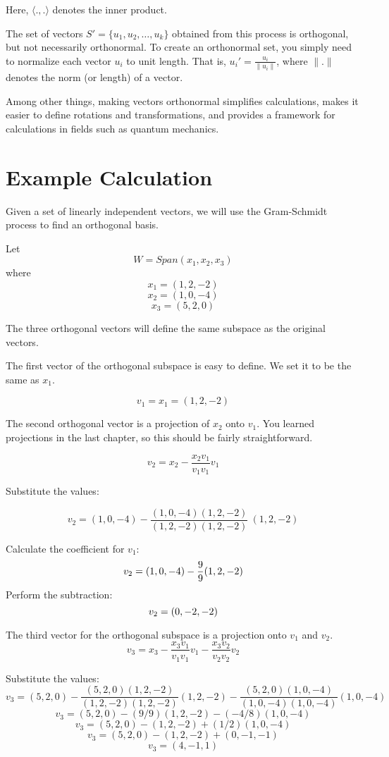 Here, $\langle . , . \rangle$ denotes the inner product. 

The set of vectors $S' = \{u_1, u_2, \ldots, u_k\}$ obtained from this
process is orthogonal, but not necessarily orthonormal. To create
an orthonormal set, you simply need to normalize each vector $u_i$ to
unit length. That is, $u_i' = \frac{u_i}{\|u_i\|}$, where $\|.\|$
denotes the norm (or length) of a vector.

Among other things, making vectors orthonormal simplifies calculations, makes it easier to define rotations and transformations, and provides a framework for calculations in fields such as quantum mechanics.

\section{Example Calculation}

Given a set of linearly independent vectors, we will use the Gram-Schmidt process to find an orthogonal basis.

Let $$W = Span (x_1, x_2, x_3)$$ where
$$x_1 = (1, 2, -2) $$
$$x_2 = (1,0,-4) $$
$$x_3 = (5,2,0)$$

The three orthogonal vectors will define the same subspace as the original vectors. 

The first vector of the orthogonal subspace is easy to define. We set it to be the same as $x_1$.

$$v_1 = x_1 = (1, 2, -2)$$

The second orthogonal vector is a projection of $x_2$ onto $v_1$. You learned projections in the last chapter, so this should be fairly straightforward.

$$v_2 = x_2 - \frac{x_2v_1}{v_1v_1} v_1$$

Substitute the values:

$$v_2 = (1, 0, -4)  - \frac{(1,0, -4)(1,2,-2)}{(1,2,-2)(1,2,-2)} \ (1, 2, -2) $$

Calculate the coefficient for $v_1$:
$$v_2 = (1, 0, -4) - \frac{9}{9} (1, 2, -2)  \\$$
Perform the subtraction:
$$v_2 = (0, -2, -2) \\$$
 
The third vector for the orthogonal subspace is a projection onto $v_1$ and $v_2$. 
$$v_3 = x_3 - \frac{x_3v_1}{v_1v_1} v_1 - \frac{x_3v_2}{v_2v_2} v_2$$

Substitute the values:
$$v_3 = (5,2,0) - \frac{(5,2,0)(1,2,-2)}{(1,2,-2)(1,2,-2)} (1,2,-2) - \frac{(5,2,0)(1,0,-4)}{(1,0,-4)(1,0,-4)} (1,0,-4)$$
$$v_3 =  (5,2,0)  - (9/9) (1,2,-2) -  (-4/8)(1,0,-4)$$
$$v_3 =  (5,2,0) - (1,2,-2) + (1/2)(1,0,-4)$$
$$v_3  = (5,2,0 ) - (1,2,-2) + (0,-1,-1)$$
$$v_3 = (4, -1, 1)$$


